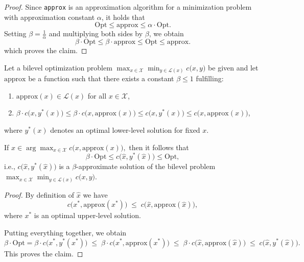 \begin{proof}
Since \texttt{approx} is an approximation algorithm for a minimization problem with approximation constant $\alpha$, it holds that
\[
\mathrm{Opt} \le \mathrm{approx} \le \alpha \cdot \mathrm{Opt}.
\]
Setting $\beta = \frac{1}{\alpha}$ and multiplying both sides by $\beta$, we obtain
\[
\beta \cdot \mathrm{Opt} \le \beta \cdot \mathrm{approx} \le \mathrm{Opt} \le \mathrm{approx}.
\]
which proves the claim.
\end{proof}

\begin{theorem}
\label{thm:approx-bilevel}
Let a bilevel optimization problem $\max_{x \in \mathcal{X}} \min_{y \in \mathcal{L}(x)} c\bigl(x, y\bigr)$ be given and let $\mathrm{approx}$
be a function such that there exists a constant $\beta \le 1$ fulfilling:
\begin{enumerate}
    \item $\mathrm{approx}(x) \in \mathcal{L}(x)$ for all $x \in \mathcal{X}$,
    \item $
    \beta \cdot c\bigl(x, y^*(x)\bigr)\le \beta \cdot c\bigl(x, \mathrm{approx}(x)\bigr) \le c\bigl(x, y^*(x)\bigr) \le c\bigl(x, \mathrm{approx}(x)\bigr) $,
\end{enumerate}
where $y^*(x)$ denotes an optimal lower-level solution for fixed $x$.

If $
\hat{x} \in \arg\max_{x \in \mathcal{X}} c\bigl(x, \mathrm{approx}(x)\bigr),$
then it follows that
\[
\beta \cdot \mathrm{Opt} \le c\bigl(\hat{x}, y^*(\hat{x})\bigr) \le \mathrm{Opt},
\]
i.e., $c\bigl(\hat{x}, y^*(\hat{x})\bigr)$ is a $\beta$-approximate solution of the bilevel problem $\max_{x \in \mathcal{X}} \min_{y \in \mathcal{L}(x)} c\bigl(x, y\bigr)$.
\end{theorem}

\begin{proof}
By definition of $\hat{x}$ we have
\[
c\bigl(x^*, \mathrm{approx}(x^*)\bigr)
\;\le\;
c\bigl(\hat{x}, \mathrm{approx}(\hat{x})\bigr),
\]
where $x^*$ is an optimal upper-level solution.

Putting everything together, we obtain
\[
\beta \cdot \mathrm{Opt}
=
\beta \cdot c\bigl(x^*, y^*(x^*)\bigr)
\;\le\;
\beta \cdot c\bigl(x^*, \mathrm{approx}(x^*)\bigr)
\;\le\;
\beta \cdot c\bigl(\hat{x}, \mathrm{approx}(\hat{x})\bigr)
\;\le\;
c\bigl(\hat{x}, y^*(\hat{x})\bigr).
\]
This proves the claim.
\end{proof}

